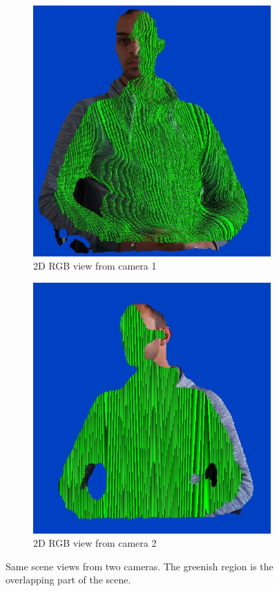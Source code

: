 \begin{figure}[H]

\begin{multicols}{2}
        \begin{subfigure}{\linewidth}
               \centering
                \includegraphics[width=.75\linewidth]{images/visual_enhancement/colour/sub_overlap_200.jpg}
               \caption{2D RGB view from camera 1}\label{figure:sub_overlap_200}
        \end{subfigure}
        
        
        \begin{subfigure}{\linewidth}
               \centering
             \includegraphics[width=.75\linewidth]{images/visual_enhancement/colour/master_overlap_200.jpg}
               \caption{2D RGB view from camera 2}\label{figure:master_overlap_200}
        \end{subfigure}
\end{multicols}\vspace{-10pt}
\caption{Same scene views from two cameras. The greenish region is the overlapping part of the scene.}
\label{figure:overlap_200}

\end{figure}


